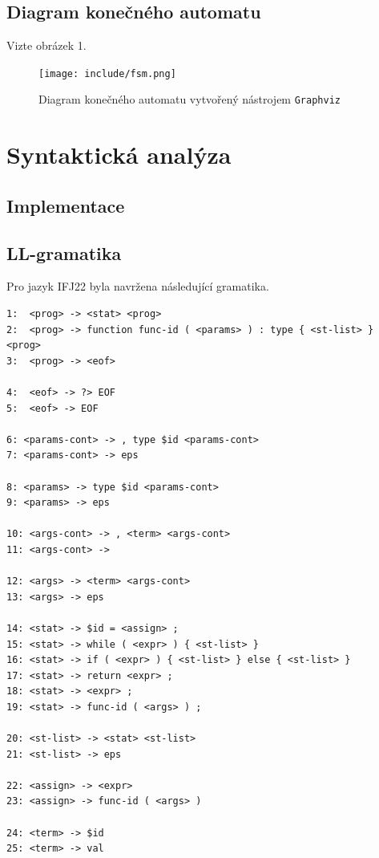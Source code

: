 \documentclass[11pt,a4paper]{article}
\begin{document}
    \subsection{Diagram konečného automatu}
    Vizte obrázek 1.
    
    \begin{figure}[H]
        \label{fig:FSM}
        \centering
        \texttt{[image: include/fsm.png]}
        \caption{Diagram konečného automatu vytvořený nástrojem \texttt{Graphviz}}
    \end{figure}

    \pagebreak{}
    
    \section{Syntaktická analýza}
    
    \subsection{Implementace}

    \subsection{LL-gramatika}
    Pro jazyk IFJ22 byla navržena následující gramatika.
    \begin{Verbatim}
1:  <prog> -> <stat> <prog>
2:  <prog> -> function func-id ( <params> ) : type { <st-list> } <prog>
3:  <prog> -> <eof>

4:  <eof> -> ?> EOF
5:  <eof> -> EOF

6: <params-cont> -> , type $id <params-cont>
7: <params-cont> -> eps

8: <params> -> type $id <params-cont>
9: <params> -> eps

10: <args-cont> -> , <term> <args-cont>
11: <args-cont> -> 

12: <args> -> <term> <args-cont>
13: <args> -> eps

14: <stat> -> $id = <assign> ;
15: <stat> -> while ( <expr> ) { <st-list> }
16: <stat> -> if ( <expr> ) { <st-list> } else { <st-list> }
17: <stat> -> return <expr> ;
18: <stat> -> <expr> ;
19: <stat> -> func-id ( <args> ) ;

20: <st-list> -> <stat> <st-list>
21: <st-list> -> eps

22: <assign> -> <expr>
23: <assign> -> func-id ( <args> )

24: <term> -> $id
25: <term> -> val
    \end{Verbatim}
\end{document}
